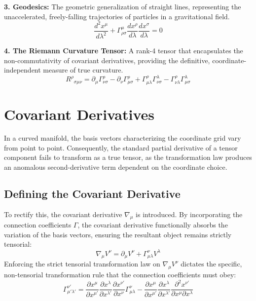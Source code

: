 \documentclass[11pt, a4paper]{report}
\begin{document}
\textbf{3. Geodesics:} The geometric generalization of straight lines, representing the unaccelerated, freely-falling trajectories of particles in a gravitational field.
\begin{equation}\label{eq:geodesic_preview}
\frac{d^{2}x^{\mu}}{d\lambda^{2}} + \Gamma_{\rho\sigma}^{\mu} \frac{dx^{\rho}}{d\lambda} \frac{dx^{\sigma}}{d\lambda} = 0
\end{equation}

\textbf{4. The Riemann Curvature Tensor:} A rank-4 tensor that encapsulates the non-commutativity of covariant derivatives, providing the definitive, coordinate-independent measure of true curvature.
\begin{equation}\label{eq:riemann_preview}
{R^{\rho}}_{\sigma\mu\nu} = \partial_{\mu}\Gamma_{\nu\sigma}^{\rho} - \partial_{\nu}\Gamma_{\mu\sigma}^{\rho} + \Gamma_{\mu\lambda}^{\rho}\Gamma_{\nu\sigma}^{\lambda} - \Gamma_{\nu\lambda}^{\rho}\Gamma_{\mu\sigma}^{\lambda}
\end{equation}

\section{Covariant Derivatives}
In a curved manifold, the basis vectors characterizing the coordinate grid vary from point to point. Consequently, the standard partial derivative of a tensor component fails to transform as a true tensor, as the transformation law produces an anomalous second-derivative term dependent on the coordinate choice.

\subsection*{Defining the Covariant Derivative}
To rectify this, the covariant derivative $\nabla_\mu$ is introduced. By incorporating the connection coefficients $\Gamma$, the covariant derivative functionally absorbs the variation of the basis vectors, ensuring the resultant object remains strictly tensorial:
\begin{equation}\label{eq:cov_deriv_vector}
\nabla_\mu V^\nu = \partial_\mu V^\nu + \Gamma^\nu_{\mu\lambda} V^\lambda
\end{equation}
Enforcing the strict tensorial transformation law on $\nabla_\mu V^\nu$ dictates the specific, non-tensorial transformation rule that the connection coefficients must obey:
\begin{equation}\label{eq:gamma_transformation}
\Gamma^{\nu'}_{\mu'\lambda'} = \frac{\partial x^\mu}{\partial x^{\mu'}} \frac{\partial x^\lambda}{\partial x^{\lambda'}} \frac{\partial x^{\nu'}}{\partial x^\nu} \Gamma^\nu_{\mu\lambda} - \frac{\partial x^\mu}{\partial x^{\mu'}} \frac{\partial x^{\lambda}}{\partial x^{\lambda'}} \frac{\partial^2 x^{\nu'}}{\partial x^\mu \partial x^\lambda}
\end{equation}
\end{document}
